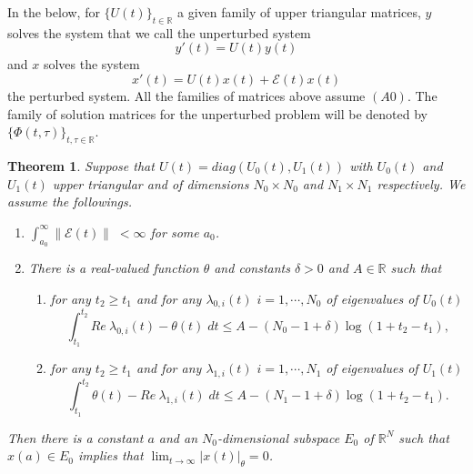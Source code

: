 \documentclass[a4paper,11pt]{article}
\newcommand{\upl}{\overline{\lambda}}
\newcommand{\udl}{\underline{\lambda}}
\newcommand{\E}{\mathcal{E}}
\newcounter{Theorem}
\newtheorem{theorem}[Theorem]{Theorem}
\theoremstyle{remark}
\begin{document}
In the below, for $\{U(t)\}_{t \in \mathbb{R}}$ a given family of upper triangular matrices, $y$ solves the system that we call the unperturbed system
\begin{equation}\label{eq:1}
 y'(t)=U(t)y(t)
\end{equation}
and $x$ solves the system
\begin{equation}\label{eq:2}
 x'(t) = U(t)x(t) + \E(t)x(t)
\end{equation}
the perturbed system. All the families of matrices above assume $(A0)$. The family of solution matrices for the unperturbed problem will be denoted by $\{\Phi(t,\tau)\}_{t,\tau \in \mathbb{R}}$.

% 
% 
% 
% 
% 
% 


\begin{theorem} Suppose that $U(t)=diag(U_0(t),U_1(t))$ with $U_0(t)$ and $U_1(t)$ upper triangular and of dimensions $N_0\times N_0$ and $N_1 \times N_1$ respectively. We assume the followings.%
\begin{enumerate}
 \item $\int_{a_0}^\infty \|\E(t)\| \; < \infty$ for some $a_0$.
 \item There is a real-valued function $\theta$ and constants $\delta >0$ and $A\in \mathbb{R}$ such that
 \begin{enumerate}
  \item for any $t_2\ge t_1$ and for any $\lambda_{0,i}(t)$ $i=1,\cdots,N_0$ of eigenvalues of $U_0(t)$ 
  $$ \int_{t_1}^{t_2} Re\: \lambda_{0,i}(t) - \theta(t) \; dt \le A -(N_0 -1 +\delta)\log(1+t_2-t_1),$$
 \item for any $t_2\ge t_1$ and for any $\lambda_{1,i}(t)$ $i=1,\cdots,N_1$ of eigenvalues of $U_1(t)$
  $$ \int_{t_1}^{t_2} \theta(t)- Re\: \lambda_{1,i}(t) \; dt \le A -(N_1 -1 +\delta)\log(1+t_2-t_1).$$
 \end{enumerate}
\end{enumerate}
Then there is a constant $a$ and an $N_0$-dimensional subspace $E_0$ of  $ \mathbb{R}^N$  such that $x(a)\in E_0$ implies that $\displaystyle \lim_{t \rightarrow \infty}|x(t)|_\theta =0$. %
\end{theorem}
\end{document}
